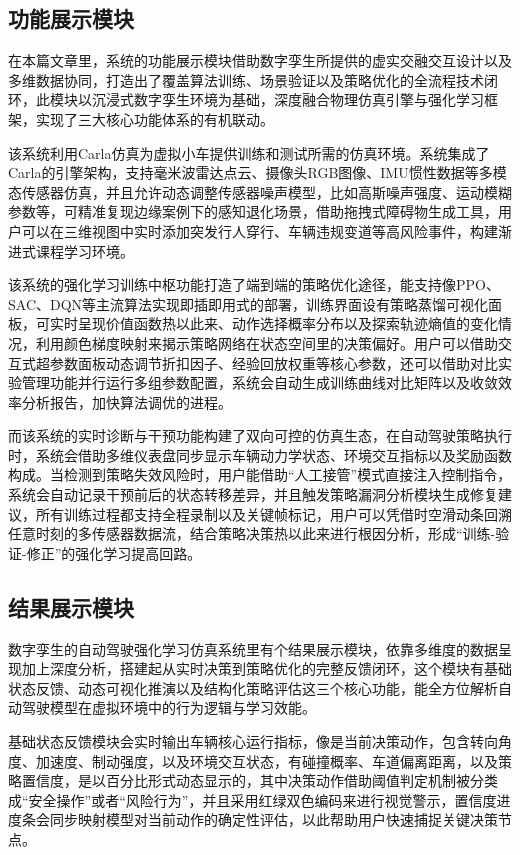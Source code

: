 \subsection{功能展示模块}
在本篇文章里，系统的功能展示模块借助数字孪生所提供的虚实交融交互设计以及多维数据协同，打造出了覆盖算法训练、场景验证以及策略优化的全流程技术闭环，此模块以沉浸式数字孪生环境为基础，深度融合物理仿真引擎与强化学习框架，实现了三大核心功能体系的有机联动。

该系统利用Carla仿真为虚拟小车提供训练和测试所需的仿真环境。系统集成了Carla的引擎架构，支持毫米波雷达点云、摄像头RGB图像、IMU惯性数据等多模态传感器仿真，并且允许动态调整传感器噪声模型，比如高斯噪声强度、运动模糊参数等，可精准复现边缘案例下的感知退化场景，借助拖拽式障碍物生成工具，用户可以在三维视图中实时添加突发行人穿行、车辆违规变道等高风险事件，构建渐进式课程学习环境。

该系统的强化学习训练中枢功能打造了端到端的策略优化途径，能支持像PPO、SAC、DQN等主流算法实现即插即用式的部署，训练界面设有策略蒸馏可视化面板，可实时呈现价值函数热以此来、动作选择概率分布以及探索轨迹熵值的变化情况，利用颜色梯度映射来揭示策略网络在状态空间里的决策偏好。用户可以借助交互式超参数面板动态调节折扣因子、经验回放权重等核心参数，还可以借助对比实验管理功能并行运行多组参数配置，系统会自动生成训练曲线对比矩阵以及收敛效率分析报告，加快算法调优的进程。

而该系统的实时诊断与干预功能构建了双向可控的仿真生态，在自动驾驶策略执行时，系统会借助多维仪表盘同步显示车辆动力学状态、环境交互指标以及奖励函数构成。当检测到策略失效风险时，用户能借助“人工接管”模式直接注入控制指令，系统会自动记录干预前后的状态转移差异，并且触发策略漏洞分析模块生成修复建议，所有训练过程都支持全程录制以及关键帧标记，用户可以凭借时空滑动条回溯任意时刻的多传感器数据流，结合策略决策热以此来进行根因分析，形成“训练-验证-修正”的强化学习提高回路。

\subsection{结果展示模块}

数字孪生的自动驾驶强化学习仿真系统里有个结果展示模块，依靠多维度的数据呈现加上深度分析，搭建起从实时决策到策略优化的完整反馈闭环，这个模块有基础状态反馈、动态可视化推演以及结构化策略评估这三个核心功能，能全方位解析自动驾驶模型在虚拟环境中的行为逻辑与学习效能。

基础状态反馈模块会实时输出车辆核心运行指标，像是当前决策动作，包含转向角度、加速度、制动强度，以及环境交互状态，有碰撞概率、车道偏离距离，以及策略置信度，是以百分比形式动态显示的，其中决策动作借助阈值判定机制被分类成“安全操作”或者“风险行为”，并且采用红绿双色编码来进行视觉警示，置信度进度条会同步映射模型对当前动作的确定性评估，以此帮助用户快速捕捉关键决策节点。


